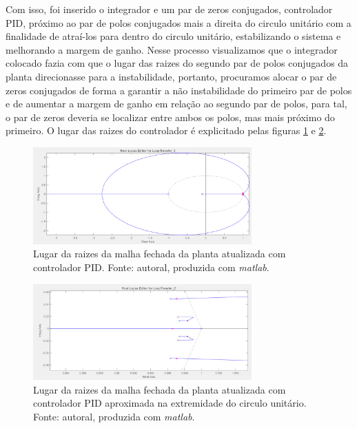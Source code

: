 \documentclass{ifacconf}
\begin{document}
Com isso, foi inserido o integrador e um par de zeros conjugados, controlador PID, próximo ao par de polos conjugados mais a direita do circulo unitário com 
a finalidade de atraí-los para dentro do circulo unitário, estabilizando o sistema e melhorando a margem de ganho. Nesse processo visualizamos
que o integrador colocado fazia com que o lugar das raizes do segundo par de polos conjugados da planta direcionasse para a instabilidade, portanto,
procuramos alocar o par de zeros conjugados de forma a garantir a não instabilidade do primeiro par de polos e de aumentar a margem de ganho em relação
ao segundo par de polos, para tal, o par de zeros deveria se localizar entre ambos os polos, mas mais próximo do primeiro. O lugar das raizes do controlador
é explicitado pelas figuras \ref{fig:lugar_raizes_mf_atualizada_controlador} e \ref{fig:lugar_raizes_mf_atualizada_controlador_zoom}. 

\begin{figure}[!htb]
  \begin{center}
  \includegraphics[width=8.4cm]{figures/lugar_raizes_controlador_finalpng.png}    %
  \caption{Lugar da raizes da malha fechada da planta atualizada com controlador PID. Fonte: autoral, produzida com \textit{matlab}.} 
  \label{fig:lugar_raizes_mf_atualizada_controlador}
  \end{center}
\end{figure}


\begin{figure}[!htb]
  \begin{center}
  \includegraphics[width=8.4cm]{figures/lugar_raizes_controlador_final_zoom.png}    %
  \caption{Lugar da raizes da malha fechada da planta atualizada com controlador PID aproximada na extremidade do circulo unitário. Fonte: autoral, produzida com \textit{matlab}.} 
  \label{fig:lugar_raizes_mf_atualizada_controlador_zoom}
  \end{center}
\end{figure}
\end{document}
